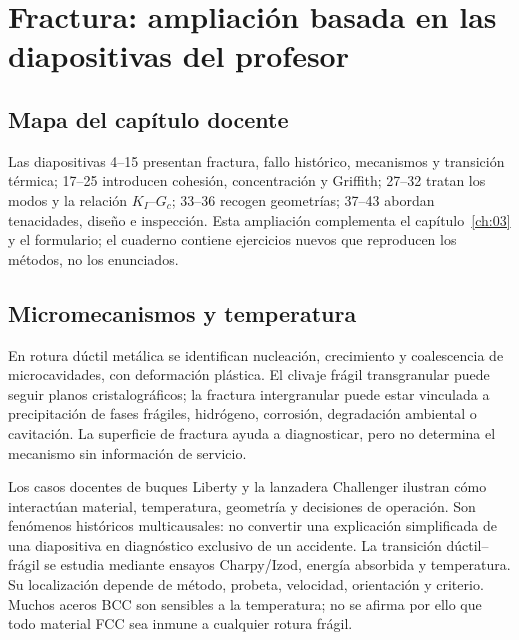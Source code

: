\chapter{Fractura: ampliación basada en las diapositivas del profesor}
\label{ch:fractura-clase}

\section{Mapa del capítulo docente}
Las diapositivas 4--15 presentan fractura, fallo histórico, mecanismos y transición térmica; 17--25 introducen cohesión, concentración y Griffith; 27--32 tratan los modos y la relación $K_I$--$G_c$; 33--36 recogen geometrías; 37--43 abordan tenacidades, diseño e inspección. Esta ampliación complementa el capítulo~\ref{ch:03} y el formulario; el cuaderno contiene ejercicios nuevos que reproducen los métodos, no los enunciados.

\section{Micromecanismos y temperatura}
En rotura dúctil metálica se identifican nucleación, crecimiento y coalescencia de microcavidades, con deformación plástica. El clivaje frágil transgranular puede seguir planos cristalográficos; la fractura intergranular puede estar vinculada a precipitación de fases frágiles, hidrógeno, corrosión, degradación ambiental o cavitación. La superficie de fractura ayuda a diagnosticar, pero no determina el mecanismo sin información de servicio.

Los casos docentes de buques Liberty y la lanzadera Challenger ilustran cómo interactúan material, temperatura, geometría y decisiones de operación. Son fenómenos históricos multicausales: no convertir una explicación simplificada de una diapositiva en diagnóstico exclusivo de un accidente. La transición dúctil--frágil se estudia mediante ensayos Charpy/Izod, energía absorbida y temperatura. Su localización depende de método, probeta, velocidad, orientación y criterio. Muchos aceros BCC son sensibles a la temperatura; no se afirma por ello que todo material FCC sea inmune a cualquier rotura frágil.

